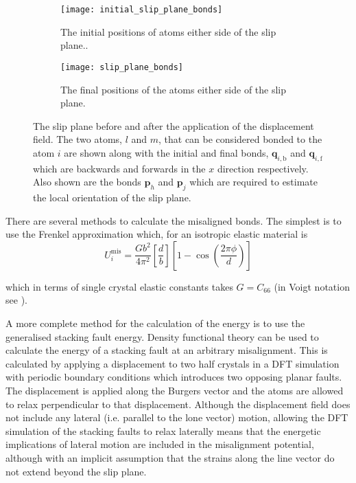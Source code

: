 \begin{figure}
\centering
\begin{subfigure}{\textwidth}
\centering
\texttt{[image: initial\_slip\_plane\_bonds]}
\caption{The initial positions of atoms either side of the slip plane.\label{fig:slip_plane_initial_positions}.}
\end{subfigure}
\par\medskip
\begin{subfigure}{\textwidth}
\texttt{[image: slip\_plane\_bonds]}
\caption{The final positions of the atoms either side of the slip plane.\label{fig:slip_plane_final_positions}}
\end{subfigure}
\caption{The slip plane before and after the application of the displacement field. The two atoms, $l$ and $m$, that can be considered bonded to the atom $i$ are shown along with the initial and final bonds, $\mathbf{q}_{i,\text{b}}$ and $\mathbf{q}_{i,\text{f}}$ which are backwards and forwards in the $x$ direction respectively. Also shown are the bonds $\mathbf{p}_h$ and $\mathbf{p}_j$ which are required to estimate the local orientation of the slip plane. \label{fig:slip_plane}}
\end{figure}


There are several methods to calculate the misaligned bonds. The simplest is to use the Frenkel approximation which, for an isotropic elastic material is 
\begin{equation}
U_i^\text{mis} = \frac{Gb^2}{4\pi^2} \left[\frac{d}{b}\right] \left[ 1 - \cos \left( \frac{2 \pi \phi}{d} \right) \right]
\end{equation}

which in terms of single crystal elastic constants takes $G=C_{66}$ (in Voigt notation see \cite{kelly_knowles2012chapter6_stress_strain}).

A more complete method for the calculation of the energy is to use the generalised stacking fault energy. Density functional theory can be used to calculate the energy of a stacking fault at an arbitrary misalignment. This is calculated by applying a displacement to two half crystals in a DFT simulation with periodic boundary conditions which introduces two opposing planar faults. The displacement is applied along the Burgers vector and the atoms are allowed to relax perpendicular to that displacement. Although the displacement field does not include any lateral (i.e. parallel to the lone vector) motion, allowing the DFT simulation of the stacking faults to relax laterally means that the energetic implications of lateral motion are included in the misalignment potential, although with an implicit assumption that the strains along the line vector do not extend beyond the slip plane. 

